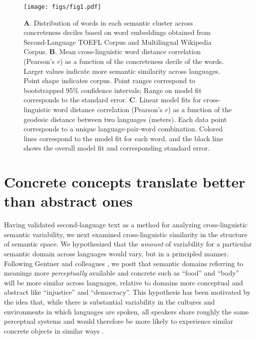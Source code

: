 \documentclass[9pt,twocolumn,twoside,lineno]{pnas-new}
\begin{document}
\begin{figure}[t!]
\centering
\texttt{[image: figs/fig1.pdf]}
\caption{{\textbf A.} Distribution of words in each semantic cluster across concreteness deciles based on word embeddings obtained from Second-Language TOEFL Corpus and  Multilingual Wikipedia Corpus. {\textbf B.} Mean cross-linguistic word distance correlation (Pearson's $r$) as a function of the concreteness decile of the words. Larger values indicate more semantic similarity across languages. Point shape indicates corpus.  Point ranges correspond to bootstrapped 95\% confidence intervals; Range on model fit corresponds to the standard error. {\textbf C.} Linear model fits for cross-linguistic word distance correlation (Pearson's $r$) as a function of the geodesic distance between two languages (meters). Each data point corresponds to a unique language-pair-word combination. Colored lines correspond to the model fit for each word, and the black line shows the overall model fit and corresponding standard error.}
\label{fig:fig1} 
\end{figure}




\section*{Concrete concepts translate better than abstract ones}
Having validated second-language text as a method for analyzing cross-linguistic semantic variability, we next examined cross-linguistic similarity in the structure of semantic space. We hypothesized that the {\it amount} of variability for a particular semantic domain across languages would vary, but in a principled manner. Following Gentner and colleagues \cite{Gentner1981-gs, Gentner1982-ro, Gentner_undated-wd, Zhou2021-dt}, we posit that semantic domains referring to meanings more \textit{perceptually} available and concrete such as ``food'' and ``body'' will be more similar across languages, relative to domains more conceptual and abstract like ``injustice'' and ``democracy''. This hypothesis has been motivated by the idea that, while there is substantial variability in the cultures and environments in which languages are spoken, all speakers share roughly the same perceptual systems and would therefore be more likely to experience similar concrete objects in similar ways \cite{rosch1975family, casasanto2011different}. 
\end{document}

